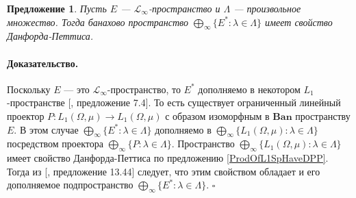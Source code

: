 \documentclass[12pt]{article}
\newtheorem{proposition}[theorem]{Предложение}
\renewenvironment{proof}{\paragraph{Доказательство.}}{\hfill$\square$\medskip}
\begin{document}
\begin{proposition}\label{ProdOfDualsOfMthscrLInftySpHaveDPP} Пусть $E$ --- $\mathscr{L}_\infty$-пространство и $\Lambda$ --- произвольное множество. Тогда банахово пространство $\bigoplus_\infty\{E^*:\lambda\in\Lambda\}$ имеет свойство Данфорда-Петтиса.
\end{proposition}
\begin{proof} Поскольку $E$ --- это $\mathscr{L}_\infty$-пространство, то $E^*$ дополняемо в некотором $L_1$-пространстве [\cite{LinPelAbsSumOpInLpSpAndApp}, предложение 7.4]. То есть существует ограниченный линейный проектор $P:L_1(\Omega,\mu)\to L_1(\Omega,\mu)$ с образом  изоморфным в $\mathbf{Ban}$ пространству $E$. В этом случае $\bigoplus_\infty\{ E^*:\lambda\in\Lambda\}$ дополняемо в $\bigoplus_\infty\{ L_1(\Omega,\mu):\lambda\in\Lambda\}$ посредством проектора $\bigoplus_\infty\{P:\lambda\in\Lambda\}$. Пространство $\bigoplus_\infty\{ L_1(\Omega,\mu):\lambda\in\Lambda\}$ имеет свойство Данфорда-Петтиса по предложению \ref{ProdOfL1SpHaveDPP}. Тогда из [\cite{FabHabBanSpTh}, предложение 13.44] следует, что этим свойством обладает и его дополняемое подпространство $\bigoplus_\infty\{ E^*:\lambda\in\Lambda\}$.
\end{proof}
\end{document}
